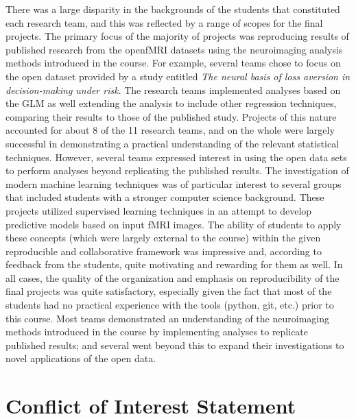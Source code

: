 There was a large disparity in the backgrounds of the students that constituted 
each research team, and this was reflected by a range of scopes for the
final projects.
The primary focus of the majority of projects was reproducing results
of published research from the openfMRI datasets using the neuroimaging 
analysis methods introduced in the course.
For example, several teams chose to focus on the open dataset provided by a
study entitled \textit{The neural basis of loss aversion in decision-making
under risk}\cite{tom2007neutral}.
The research teams implemented analyses based on the GLM as well extending
the analysis to include other regression techniques, comparing their results
to those of the published study.
Projects of this nature accounted for about 8 of the 11 research teams, and
on the whole were largely successful in demonstrating a practical understanding
of the relevant statistical techniques.
However, several teams expressed interest in using the open data sets to 
perform analyses beyond replicating the published results.
The investigation of modern machine learning techniques was of particular 
interest to several groups that included students with a stronger computer
science background.
These projects utilized supervised learning techniques in an attempt to 
develop predictive models based on input fMRI images.
The ability of students to apply these concepts (which were largely external
to the course) within the given reproducible and collaborative 
framework was impressive and, according to feedback from the students, quite
motivating and rewarding for them as well.
In all cases, the quality of the organization and emphasis on reproducibility
of the final projects was quite satisfactory, especially given the fact that
most of the students had no practical experience with the tools (python, git,
etc.) prior to this course.
Most teams demonstrated an understanding of the neuroimaging methods introduced
in the course by implementing analyses to replicate published results; and 
several went beyond this to expand their investigations to novel applications
of the open data.





\section*{Conflict of Interest Statement}

